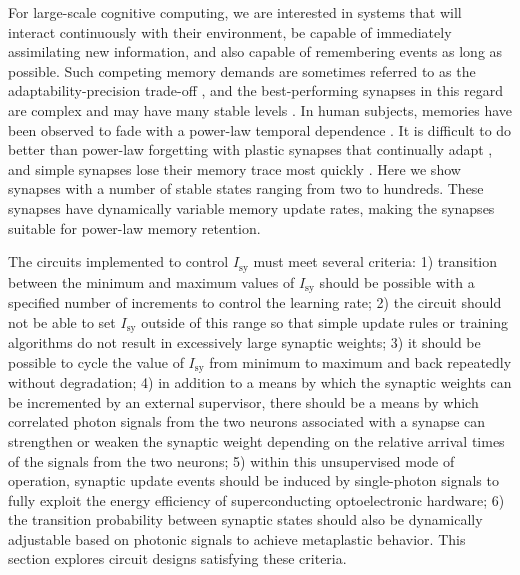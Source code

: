 \documentclass[aip,amsmath,amssymb,reprint,nofootinbib]{revtex4-1}
\begin{document}
For large-scale cognitive computing, we are interested in systems that will interact continuously with their environment, be capable of immediately assimilating new information, and also capable of remembering events as long as possible. Such competing memory demands are sometimes referred to as the adaptability-precision trade-off \cite{khso2017}, and the best-performing synapses in this regard are complex \cite{fudr2005} and may have many stable levels \cite{fuab2007}. In human subjects, memories have been observed to fade with a power-law temporal dependence \cite{wieb1991,wieb1997}. It is difficult to do better than power-law forgetting with plastic synapses that continually adapt \cite{fudr2005}, and simple synapses lose their memory trace most quickly \cite{fuab2007}. Here we show synapses with a number of stable states ranging from two to hundreds. These synapses have dynamically variable memory update rates, making the synapses suitable for power-law memory retention.

The circuits implemented to control $I_{\mathrm{sy}}$ must meet several criteria: 1) transition between the minimum and maximum values of $I_{\mathrm{sy}}$ should be possible with a specified number of increments to control the learning rate; 2) the circuit should not be able to set $I_{\mathrm{sy}}$ outside of this range so that simple update rules or training algorithms do not result in excessively large synaptic weights; 3) it should be possible to cycle the value of $I_{\mathrm{sy}}$ from minimum to maximum and back repeatedly without degradation; 4) in addition to a means by which the synaptic weights can be incremented by an external supervisor, there should be a means by which correlated photon signals from the two neurons associated with a synapse can strengthen or weaken the synaptic weight depending on the relative arrival times of the signals from the two neurons; 5) within this unsupervised mode of operation, synaptic update events should be induced by single-photon signals to fully exploit the energy efficiency of superconducting optoelectronic hardware; 6) the transition probability between synaptic states should also be dynamically adjustable based on photonic signals to achieve metaplastic behavior. This section explores circuit designs satisfying these criteria.
\end{document}
